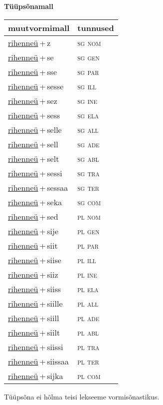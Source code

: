 
\vspace{1.8em}
\begin{minipage}{\textwidth}
\textbf{Tüüpsõnamall \,}\\

\begin{sideways}
\begin{tabular}{l l}
muutvormimall & tunnused \\
\hline
\underline{rihenneü}\,+\,z & \textsc{ sg nom } \\
\underline{rihenneü}\,+\,se & \textsc{ sg gen } \\
\underline{rihenneü}\,+\,sse & \textsc{ sg par } \\
\underline{rihenneü}\,+\,sesse & \textsc{ sg ill } \\
\underline{rihenneü}\,+\,sez & \textsc{ sg ine } \\
\underline{rihenneü}\,+\,sess & \textsc{ sg ela } \\
\underline{rihenneü}\,+\,selle & \textsc{ sg all } \\
\underline{rihenneü}\,+\,sell & \textsc{ sg ade } \\
\underline{rihenneü}\,+\,selt & \textsc{ sg abl } \\
\underline{rihenneü}\,+\,sessi & \textsc{ sg tra } \\
\underline{rihenneü}\,+\,sessaa & \textsc{ sg ter } \\
\underline{rihenneü}\,+\,seka & \textsc{ sg com } \\
\underline{rihenneü}\,+\,sed & \textsc{ pl nom } \\
\underline{rihenneü}\,+\,sije & \textsc{ pl gen } \\
\underline{rihenneü}\,+\,siit & \textsc{ pl par } \\
\underline{rihenneü}\,+\,siise & \textsc{ pl ill } \\
\underline{rihenneü}\,+\,siiz & \textsc{ pl ine } \\
\underline{rihenneü}\,+\,siiss & \textsc{ pl ela } \\
\underline{rihenneü}\,+\,siille & \textsc{ pl all } \\
\underline{rihenneü}\,+\,siill & \textsc{ pl ade } \\
\underline{rihenneü}\,+\,siilt & \textsc{ pl abl } \\
\underline{rihenneü}\,+\,siissi & \textsc{ pl tra } \\
\underline{rihenneü}\,+\,siissaa & \textsc{ pl ter } \\
\underline{rihenneü}\,+\,sijka & \textsc{ pl com } \\
\end{tabular}
\end{sideways}
\label{tab:tüüpsõnamall-rihenneüz}

\end{minipage}

 
\vspace{1em}
\noindent Tüüpsõna ei hõlma teisi lekseeme vormi\-sõnastikus.
